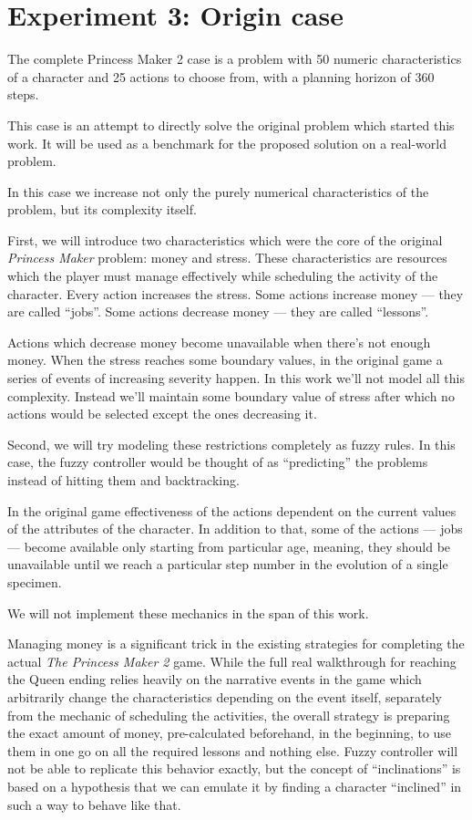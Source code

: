 \documentclass[12pt, a4paper]{article}
\begin{document}
	\section{Experiment 3: Origin case}

	The complete Princess Maker 2 case is a problem with 50 numeric characteristics of a character and 25 actions to choose from, with a planning horizon of 360 steps.

	This case is an attempt to directly solve the original problem which started this work.
	It will be used as a benchmark for the proposed solution on a real-world problem.

	In this case we increase not only the purely numerical characteristics of the problem, but its complexity itself.

First, we will introduce two characteristics which were the core of the original \textit{Princess Maker} problem: money and stress.
These characteristics are resources which the player must manage effectively while scheduling the activity of the character.
Every action increases the stress.
Some actions increase money --- they are called ``jobs''.
Some actions decrease money --- they are called ``lessons''.

Actions which decrease money become unavailable when there's not enough money.
When the stress reaches some boundary values, in the original game a series of events of increasing severity happen.
In this work we'll not model all this complexity.
Instead we'll maintain some boundary value of stress after which no actions would be selected except the ones decreasing it.


Second, we will try modeling these restrictions completely as fuzzy rules.
In this case, the fuzzy controller would be thought of as ``predicting'' the problems instead of hitting them and backtracking.

In the original game effectiveness of the actions dependent on the current values of the attributes of the character.
In addition to that, some of the actions --- jobs --- become available only starting from particular age, meaning, they should be unavailable until we reach a particular step number in the evolution of a single specimen.

We will not implement these mechanics in the span of this work.

	Managing money is a significant trick in the existing strategies for completing the actual \textit{The Princess Maker 2} game.
While the full real walkthrough for reaching the Queen ending relies heavily on the narrative events in the game which arbitrarily change the characteristics depending on the event itself, separately from the mechanic of scheduling the activities, the overall strategy is preparing the exact amount of money, pre-calculated beforehand, in the beginning, to use them in one go on all the required lessons and nothing else.
Fuzzy controller will not be able to replicate this behavior exactly, but the concept of ``inclinations'' is based on a hypothesis that we can emulate it by finding a character ``inclined'' in such a way to behave like that.
\end{document}
